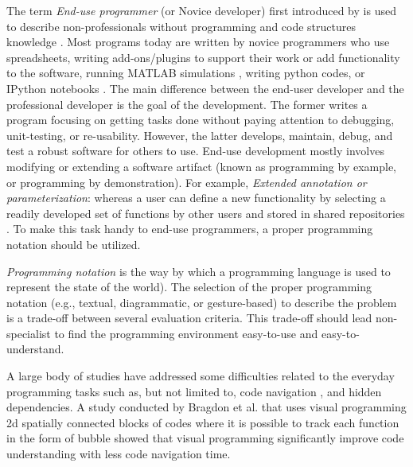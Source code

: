 \documentclass{scsSimAUDPaperFormat}
\begin{document}
The term \textit{End-use programmer} (or Novice developer) first introduced by \cite{Nardi1993AComputing} is used to describe non-professionals without programming and code structures knowledge \cite{MARGARETM.BURNETTANDCHRISTOPHERSCAFFIDIEnd-UserEd.}. Most programs today are written by novice programmers \cite{Rothermel2011TheEngineering} who use spreadsheets, writing add-ons/plugins to support their work or add functionality to the software, running MATLAB simulations \cite{MATLABSimulink}, writing python codes, or IPython notebooks \cite{ScaffidiEstimatingProgrammers}. The main difference between the end-user developer and the professional developer is the goal of the development. The former writes a program focusing on getting tasks done without paying attention to debugging, unit-testing, or re-usability. However, the latter develops, maintain, debug, and test a robust software for others to use\cite{LiebermanEnd-userDevelopment}. End-use development mostly involves modifying or extending a software artifact (known as programming by example, or programming by demonstration). For example, \textit{Extended annotation or parameterization}: whereas a user can define a new functionality by selecting a readily developed set of functions by other users and stored in shared repositories \cite{Lieberman2006End-UserParadigm}. To make this task handy to end-use programmers, a proper programming notation should be utilized.

\textit{Programming notation} is the way by which a programming language is used to represent the state of the world\cite{Green2004InstructionsDescriptions}). The selection of the proper programming notation (e.g., textual, diagrammatic, or gesture-based) to describe the problem is a trade-off between several evaluation criteria\cite{Green2004InstructionsDescriptions}. This trade-off should lead non-specialist to find the programming environment easy-to-use and easy-to-understand. 

A large body of studies have addressed some difficulties related to the everyday programming tasks such as, but not limited to, code navigation \cite{DeLine2006CodeCode}, and hidden dependencies. A study conducted by Bragdon et al. \cite{Bragdon2010CodeMaintenance} that uses visual programming 2d spatially connected blocks of codes where it is possible to track each function in the form of bubble showed that visual programming significantly improve code understanding with less code navigation time.
\end{document}
